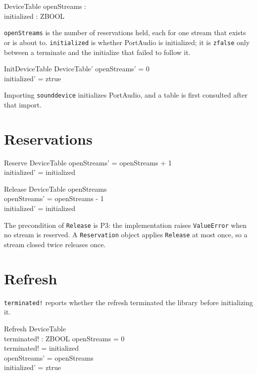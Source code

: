 \documentclass[a4paper,10pt,fleqn]{article}
\begin{document}
\begin{schema}{DeviceTable}
  openStreams : \nat \\
  initialized : ZBOOL
\end{schema}

\texttt{openStreams} is the number of reservations held, each for one
stream that exists or is about to. \texttt{initialized} is whether PortAudio
is initialized; it is \texttt{zfalse} only between a terminate and the
initialize that failed to follow it.

\begin{schema}{InitDeviceTable}
  DeviceTable'
\where
  openStreams' = 0 \\
  initialized' = ztrue
\end{schema}

Importing \texttt{sounddevice} initializes PortAudio, and a table is first
consulted after that import.

\section{Reservations}

\begin{schema}{Reserve}
  \Delta DeviceTable
\where
  openStreams' = openStreams + 1 \\
  initialized' = initialized
\end{schema}

\begin{schema}{Release}
  \Delta DeviceTable
\where
  openStreams  \\
  openStreams' = openStreams - 1 \\
  initialized' = initialized
\end{schema}

The precondition of \texttt{Release} is P3: the implementation raises
\texttt{ValueError} when no stream is reserved. A \texttt{Reservation}
object applies \texttt{Release} at most once, so a stream closed twice
releases once.

\section{Refresh}

\texttt{terminated!} reports whether the refresh terminated the library
before initializing it.

\begin{schema}{Refresh}
  \Delta DeviceTable \\
  terminated! : ZBOOL
\where
  openStreams = 0 \\
  terminated! = initialized \\
  openStreams' = openStreams \\
  initialized' = ztrue
\end{schema}
\end{document}
